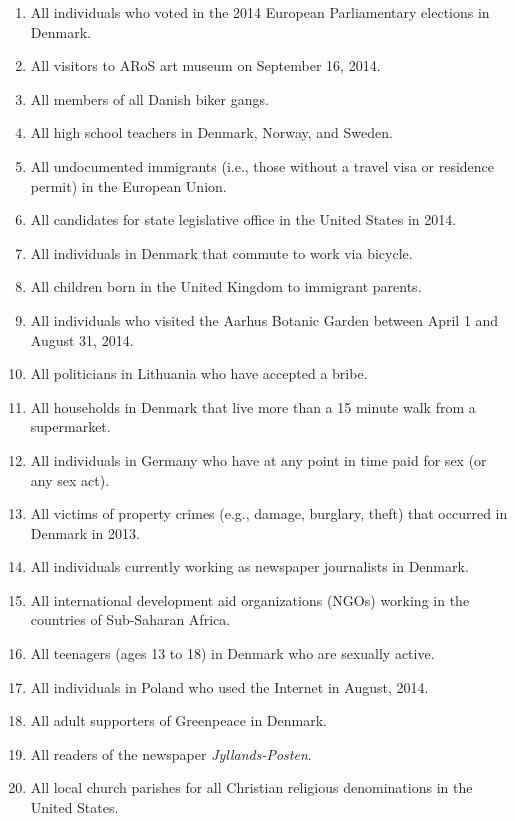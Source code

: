 \documentclass[a4, 12pt]{article}
\begin{document}
\begin{enumerate}\itemsep2em

\item All individuals who voted in the 2014 European Parliamentary elections in Denmark.

\item All visitors to ARoS art museum on September 16, 2014.

\item All members of all Danish biker gangs.

\item All high school teachers in Denmark, Norway, and Sweden.

\item All undocumented immigrants (i.e., those without a travel visa or residence permit) in the European Union.

\item All candidates for state legislative office in the United States in 2014.

\item All individuals in Denmark that commute to work via bicycle.

\item All children born in the United Kingdom to immigrant parents.

\item All individuals who visited the Aarhus Botanic Garden between April 1 and August 31, 2014.

\item All politicians in Lithuania who have accepted a bribe.

\item All households in Denmark that live more than a 15 minute walk from a supermarket.

\item All individuals in Germany who have at any point in time paid for sex (or any sex act).

\item All victims of property crimes (e.g., damage, burglary, theft) that occurred in Denmark in 2013.

\item All individuals currently working as newspaper journalists in Denmark.

\item All international development aid organizations (NGOs) working in the countries of Sub-Saharan Africa.

\item All teenagers (ages 13 to 18) in Denmark who are sexually active.

\item All individuals in Poland who used the Internet in August, 2014.

\item All adult supporters of Greenpeace in Denmark.

\item All readers of the newspaper \textit{Jyllands-Posten}.

\item All local church parishes for all Christian religious denominations in the United States.

\end{enumerate}
\end{document}
